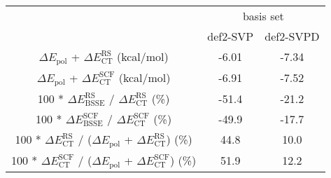 \begin{tabular}{ccc}
\toprule
& \multicolumn{2}{c}{basis set} \\
& def2-SVP & def2-SVPD \\
\midrule
\(\Delta E_{\textrm{pol}}\) + \(\Delta E_{\textrm{CT}}^{\textrm{RS}}\) (kcal/mol) & -6.01 & -7.34 \\
\(\Delta E_{\textrm{pol}}\) + \(\Delta E_{\textrm{CT}}^{\textrm{SCF}}\) (kcal/mol) & -6.91 & -7.52 \\
100 * \(\Delta E_{\textrm{BSSE}}^{\textrm{RS}}\) / \(\Delta E_{\textrm{CT}}^{\textrm{RS}}\) (\%) & -51.4 & -21.2 \\
100 * \(\Delta E_{\textrm{BSSE}}^{\textrm{SCF}}\) / \(\Delta E_{\textrm{CT}}^{\textrm{SCF}}\) (\%) & -49.9 & -17.7 \\
100 * \(\Delta E_{\textrm{CT}}^{\textrm{RS}}\) / (\(\Delta E_{\textrm{pol}}\) + \(\Delta E_{\textrm{CT}}^{\textrm{RS}}\)) (\%) & 44.8 & 10.0 \\
100 * \(\Delta E_{\textrm{CT}}^{\textrm{SCF}}\) / (\(\Delta E_{\textrm{pol}}\) + \(\Delta E_{\textrm{CT}}^{\textrm{SCF}}\)) (\%) & 51.9 & 12.2 \\
\bottomrule
\end{tabular}